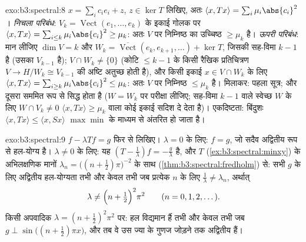 \begin{solution}{exo:b3:spectral:8}
$x = \sum_ic_ie_i + z$, $z \in \ker T$ लिखिए, अतः $\langle x,
Tx\rangle = \sum_i\mu_i\abs{c_i}^2$। \emph{निचला परिबंध}: $V_k = \operatorname{Vect}(e_1, \dots,
e_k)$ के इकाई
गोलक पर $\langle x, Tx\rangle = \sum_{i\leq
k}\mu_i\abs{c_i}^2 \geq \mu_k$: अतः $V$ पर निम्निष्ठ का उच्चिष्ठ $\geq \mu_k$ है। \emph{ऊपरी
परिबंध}: मान लीजिए $\dim V = k$ और $W_k
= \overline{\operatorname{Vect}}(e_k, e_{k+1}, \dots) +
\ker T$, जिसकी सह-विमा $k - 1$ है (उसका
 $V_{k-1}$ है); $V \cap W_k \neq \{0\}$ (कोटि $\leq k - 1$ के किसी रैखिक प्रतिचित्रण
$V \to
H/W_k \cong V_{k-1}$ की अष्टि अतुच्छ होती है), और किसी इकाई $x \in V\cap W_k$ के लिए $\langle x,
Tx\rangle = \sum_{i \geq k}\mu_i\abs{c_i}^2 \leq \mu_k$: अतः
$V$ पर निम्निष्ठ $\leq \mu_k$ है। मिलाकर: पहला सूत्र; और दूसरा सममित रूप
से सिद्ध होता है ($W = W_k$ पर परीक्षा लीजिए; सह-विमा $k-1$ वाले स्वेच्छ
$W$ के लिए $W \cap V_k \neq 0$ $\langle x, Tx\rangle \geq \mu_k$ वाला कोई इकाई सदिश दे देता है)। एकदिष्टता:
बिंदुशः $\langle x, Tx\rangle \leq \langle x,
Sx\rangle$ $\max\min$ के माध्यम से अंतरित हो जाता है।
\end{solution}

\begin{solution}{exo:b3:spectral:9}
$f - \lambda Tf = g$ फिर से लिखिए। $\lambda = 0$ के लिए: $f = g$, जो सदैव अद्वितीय रूप से
हल-योग्य है। $\lambda \neq 0$ के लिए: यह $(T - \frac1\lambda)f = -\frac g\lambda$ है, और $T$ (\cref{ex:b3:spectral:minxy}) के अभिलक्षणिक
मानों $\lambda_n = \bigl((n + \frac12)\pi\bigr)^{-2}$ के साथ  (\cref{thm:b3:spectral:fredholm}) से: सभी $g$ के लिए
अद्वितीय हल-योग्यता तभी और केवल तभी जब प्रत्येक $n$ के लिए $\frac1\lambda \neq \lambda_n$,
अर्थात्
\[
\lambda \neq \Bigl(n + \tfrac12\Bigr)^2\pi^2
\qquad (n = 0, 1, 2, \dots).
\]
किसी अपवादिक $\lambda = (n+\frac12)^2\pi^2$ पर: हल विद्यमान हैं तभी और केवल तभी जब $g \perp \sin\bigl((n{+}\frac12)\pi x\bigr)$, और
तब वे उस ज्या के गुणज जोड़ने तक अद्वितीय हैं।
\end{solution}

